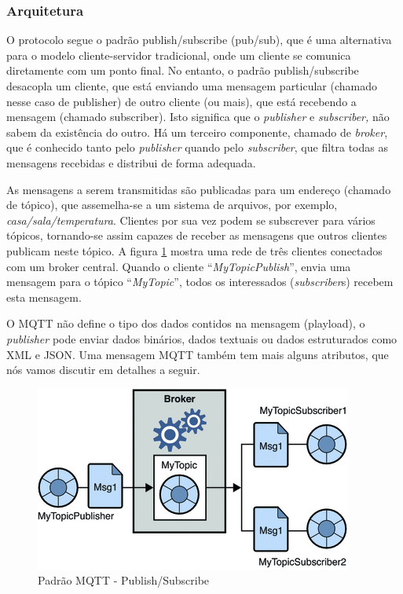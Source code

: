 \subsubsection{Arquitetura}

O protocolo segue o padrão publish/subscribe (pub/sub), que é uma
alternativa para o modelo cliente-servidor tradicional, onde um cliente
se comunica diretamente com um ponto final. No entanto, o padrão publish/subscribe
desacopla um cliente, que está enviando uma mensagem particular (chamado
nesse caso de publisher) de outro cliente (ou mais), que está recebendo
a mensagem (chamado subscriber). Isto significa que o \emph{publisher}
e \emph{subscriber,} não sabem da existência do outro. Há um terceiro
componente, chamado de \emph{broker}, que é conhecido tanto pelo \emph{publisher}
quando pelo \emph{subscriber}, que filtra todas as mensagens recebidas
e distribui de forma adequada. 

As mensagens a serem transmitidas são publicadas para um endereço
(chamado de tópico), que assemelha-se a um sistema de arquivos, por
exemplo, \emph{casa/sala/temperatura}. Clientes por sua vez podem
se subscrever para vários tópicos, tornando-se assim capazes de receber
as mensagens que outros clientes publicam neste tópico. A figura \ref{fig:mqtt}
mostra uma rede de três clientes conectados com um broker central.
Quando o cliente ``\emph{MyTopicPublish}'', envia uma mensagem para
o tópico ``\emph{MyTopic}'', todos os interessados (\emph{subscriber}s)
recebem esta mensagem.

O MQTT não define o tipo dos dados contidos na mensagem (playload),
o \emph{publisher} pode enviar dados binários, dados textuais ou dados
estruturados como XML e JSON. Uma mensagem MQTT também tem mais alguns
atributos, que nós vamos discutir em detalhes a seguir.

\begin{figure}[h]
\begin{centering}
\includegraphics[width=0.8\linewidth]{Imagens/Cap_2/mqtt_broker}
\par\end{centering}
\caption{Padrão MQTT - Publish/Subscribe \cite{img:mqtt:oracle}\label{fig:mqtt}}
\end{figure}
 

